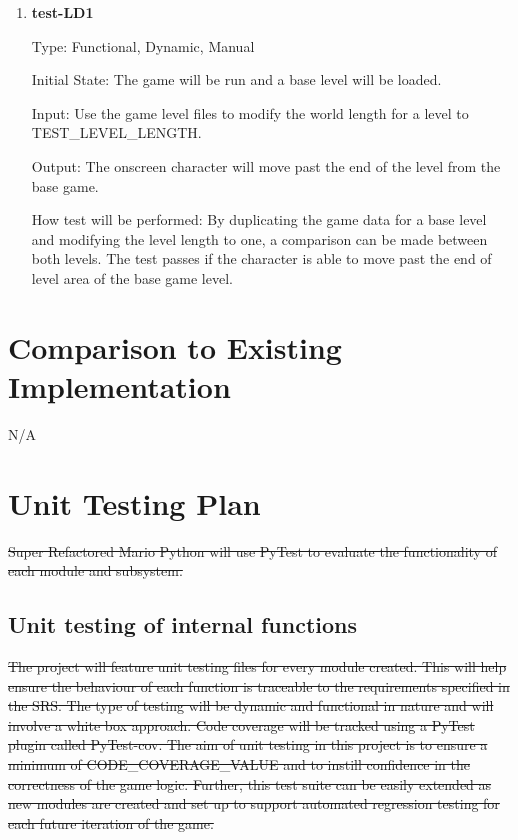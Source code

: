\documentclass[12pt, titlepage]{article}
\begin{document}
\begin{enumerate}

\item{\textbf{test-LD1\\}}

Type: Functional, Dynamic, Manual

Initial State: The game will be run and a base level will be loaded.

Input: Use the game level files to modify the world length for a level to TEST\_LEVEL\_LENGTH.

Output: The onscreen character will move past the end of the level from the base game.

How test will be performed: By duplicating the game data for a base level and modifying the level length to one, a comparison can be made between both levels. The test passes if the character is able to move past the end of level area of the base game level.

\end{enumerate}



\section{Comparison to Existing Implementation}
N/A



\section{Unit Testing Plan}
\sout{Super Refactored Mario Python will use PyTest to evaluate the functionality of each module and subsystem.}	\subsection{Unit testing of internal functions}
	\sout{The project will feature unit testing files for every module created. This will help ensure the behaviour of each function is traceable to the requirements specified in the SRS. The type of testing will be dynamic and functional in nature and will involve a white box approach. Code coverage will be tracked using a PyTest plugin called PyTest-cov. The aim of unit testing in this project is to ensure a minimum of CODE\_COVERAGE\_VALUE and to instill confidence in the correctness of the game logic. Further, this test suite can be easily extended as new modules are created and set up to support automated regression testing for each future iteration of the game.}
\end{document}
